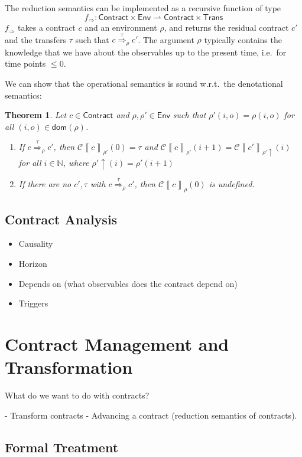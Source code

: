\documentclass[a4paper,debug,twocolumn]{easychair}
\newcommand\type[1]{\mathsf{#1}}
\newcommand\nats{{\mathbb N}}
\newcommand\pto{\rightharpoonup}
\newcommand\cSem[2]{{\mathcal C}\left\llbracket#1\right\rrbracket_{#2}}
\newcommand\cRed[2]{\stackrel{#2}\Rightarrow_{#1}}
\newcommand\cRedFun{f_{\Rightarrow}}
\newcommand\envAdv[1]{#1\uparrow}
\theoremstyle{plain}
\newtheorem{theorem}{Theorem}
\begin{document}
The reduction semantics can be implemented as a recursive function of
type 
\[
\cRedFun \colon\type{Contract}\times \type{Env} \pto \type{Contract} \times \type{Trans}
\]
$\cRedFun$ takes a contract $c$ and an environment $\rho$, and returns
the residual contract $c'$ and the transfers $\tau$ such that $c
\cRed\rho\tau c'$. The argument $\rho$ typically contains the
knowledge that we have about the observables up to the present time,
i.e.\ for time points $\leq 0$.

We can show that the operational semantics is sound w.r.t.\ the
denotational semantics:
\begin{theorem}
  Let $c \in \type {Contract}$ and $\rho,\rho' \in \type{Env}$ such
  that $\rho'(i,o) = \rho(i,o)$ for all $(i,o) \in
  \mathsf{dom}(\rho)$.
  \begin{enumerate}
  \item If $c \cRed\rho\tau c'$, then $\cSem c {\rho'} (0) = \tau$ and
    $\cSem c {\rho'} (i+1) = \cSem{c'}{\envAdv{\rho'}}(i)$ for all $i
    \in \nats$, where $\envAdv{\rho'} (i) = \rho'(i+1)$
  \item If there are no $c', \tau$ with $c \cRed\rho\tau c'$, then
    $\cSem c \rho (0)$ is undefined.
  \end{enumerate}
\end{theorem}


\subsection{Contract Analysis}
\label{sec:contract-analysis}

\begin{itemize}
\item Causality
\item Horizon
\item Depends on (what observables does the contract depend on)
\item Triggers
\end{itemize}


\section{Contract Management and Transformation}
\label{sec:contract-management}

What do we want to do with contracts?

- Transform contracts
- Advancing a contract (reduction semantics of contracts).

\subsection{Formal Treatment}
\label{sec:properties}
\end{document}
